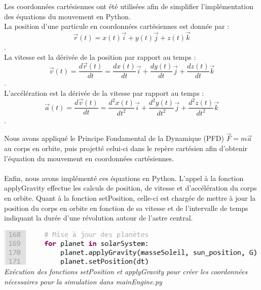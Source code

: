 \documentclass{article}
\begin{document}
        Les coordonnées cartésiennes ont été utilisées afin de simplifier l'implémentation des équations du mouvement en Python. \\
        La position d'une particule en coordonnées cartésiennes est donnée par :
        \begin{equation}
            \vec{r}(t) = x(t) \vec{i} + y(t) \vec{j} + z(t) \vec{k}
        \end{equation}. \\
        La vitesse est la dérivée de la position par rapport au temps :
        \begin{equation}
            \vec{v}(t) = \frac{d\vec{r}(t)}{dt} = \frac{dx(t)}{dt} \vec{i} + \frac{dy(t)}{dt} \vec{j} + \frac{dz(t)}{dt} \vec{k}
        \end{equation}. \\    
        L'accélération est la dérivée de la vitesse par rapport au temps :
        \begin{equation}
            \vec{a}(t) = \frac{d\vec{v}(t)}{dt} = \frac{d^2x(t)}{dt^2} \vec{i} + \frac{d^2y(t)}{dt^2} \vec{j} + \frac{d^2z(t)}{dt^2} \vec{k}
        \end{equation}.

        
        Nous avons appliqué le Principe Fondamental de la Dynamique (PFD) $\vec{F} = m \vec{a}$ au corps en orbite, puis projetté celui-ci dans le repère cartésien afin d'obtenir l'équation du mouvement en coordonnées cartésiennes.

        \paragraph{}
        Enfin, nous avons implémenté ces équations en Python. L'appel à la fonction applyGravity effectue les calculs de position, de vitesse et d'accélération du corps en orbite. Quant à la fonction setPosition, celle-ci est chargée de mettre à jour la position du corps en orbite en fonction de sa vitesse et de l'intervalle de temps indiquant la durée d'une révolution autour de l'astre central.

        \begin{center}
            \includegraphics[scale=0.5]{naifMain.png} \\
            \emph{Exécution des fonctions setPosition et applyGravity pour créer les coordonnées nécessaires pour la simulation dans mainEngine.py}
        \end{center}
\end{document}
